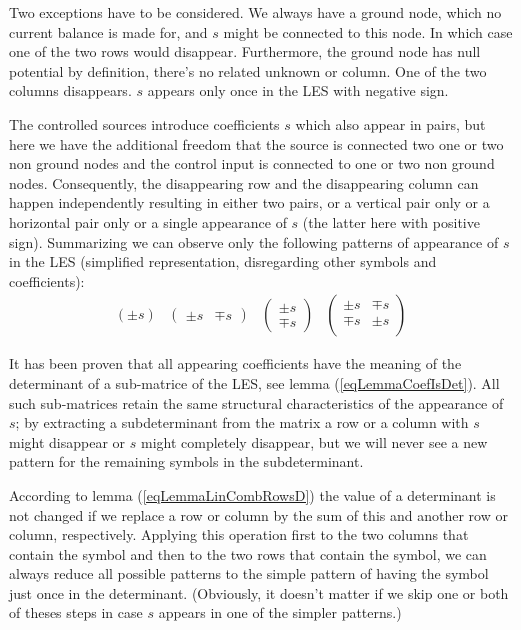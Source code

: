 Two exceptions have to be considered. We always have a ground node, which
no current balance is made for, and $s$ might be connected to this node. In
which case one of the two rows would disappear. Furthermore, the ground
node has null potential by definition, there's no related unknown or
column. One of the two columns disappears. $s$ appears only once in the
LES with negative sign.

The controlled sources introduce coefficients $s$ which also appear in
pairs, but here we have the additional freedom that the source is connected
two one or two non ground nodes and the control input is connected to one
or two non ground nodes. Consequently, the disappearing row and the
disappearing column can happen independently resulting in either two
pairs, or a vertical pair only or a horizontal pair only or a single
appearance of $s$ (the latter here with positive sign). Summarizing we can
observe only the following patterns of appearance of $s$ in the LES
(simplified representation, disregarding other symbols and coefficients):
\begin{equation}
\label{eqPatternsOfAppearance}
\begin{array}{cccc}
\left(
\pm s
\right)
&
\left(
\begin{array}{cc}
\pm s & \mp s
\end{array}
\right)
&
\left(
\begin{array}{c}
\pm s \\
\mp s
\end{array}
\right)
&
\left(
\begin{array}{cc}
\pm s & \mp s \\
\mp s & \pm s \\
\end{array}
\right)
\end{array}
\end{equation}

It has been proven that all appearing coefficients have the meaning of the
determinant of a sub-matrice of the LES, see lemma (\ref{eqLemmaCoefIsDet}).
All such sub-matrices retain the same structural characteristics of the
appearance of $s$; by extracting a subdeterminant from the matrix a row
or a column with $s$ might disappear or $s$ might completely disappear,
but we will never see a new pattern for the remaining symbols in the
subdeterminant.

According to lemma (\ref{eqLemmaLinCombRowsD}) the value of a determinant
is not changed if we replace a row or column by the sum of this and
another row or column, respectively. Applying this operation first to the
two columns that contain the symbol and then to the two rows that contain
the symbol, we can always reduce all possible patterns to the simple
pattern of having the symbol just once in the determinant. (Obviously, it
doesn't matter if we skip one or both of theses steps in case $s$ appears
in one of the simpler patterns.)

